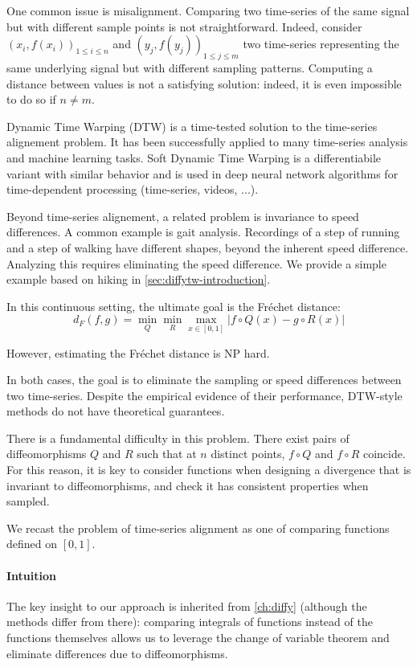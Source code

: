 One common issue is misalignment. Comparing two time-series of the same signal but with different sample points is not straightforward. Indeed, consider $(x_i, f(x_i))_{1\leq i\leq n}$ and $(y_j, f(y_j))_{1 \leq j \leq m}$ two time-series representing the same underlying signal but with different sampling patterns. Computing a distance between values is not a satisfying solution: indeed, it is even impossible to do so if $n\neq m$.

Dynamic Time Warping (DTW) is a time-tested solution to the time-series alignement problem. It has been successfully applied to many time-series analysis and machine learning tasks. Soft Dynamic Time Warping is a differentiabile variant with similar behavior and is used in deep neural network algorithms for time-dependent processing (time-series, videos, ...).

Beyond time-series alignement, a related problem is invariance to speed differences. A common example is gait analysis. Recordings of a step of running and a step of walking have different shapes, beyond the inherent speed difference. Analyzing this requires eliminating the speed difference. We provide a simple example based on hiking in \cref{sec:diffytw-introduction}.

In this continuous setting, the ultimate goal is the Fréchet distance:
\begin{equation}
d_{F}(f, g) = \min_{Q}\min_{R}\max_{x\in[0,1]}\vert f\circ Q(x) - g\circ R(x)\vert
\end{equation}

However, estimating the Fréchet distance is NP hard.

In both cases, the goal is to eliminate the sampling or speed differences between two time-series. Despite the empirical evidence of their performance, DTW-style methods do not have theoretical guarantees.

There is a fundamental difficulty in this problem. There exist pairs of diffeomorphisms $Q$ and $R$ such that at $n$ distinct points, $f\circ Q$ and $f \circ R$ coincide. For this reason, it is key to consider functions when designing a divergence that is invariant to diffeomorphisms, and check it has consistent properties when sampled.

We recast the problem of time-series alignment as one of comparing functions defined on $[0,1]$.

\paragraph{Intuition}
The key insight to our approach is inherited from \cref{ch:diffy} (although the methods differ from there): comparing integrals of functions instead of the functions themselves allows us to leverage the change of variable theorem and eliminate differences due to diffeomorphisms.

